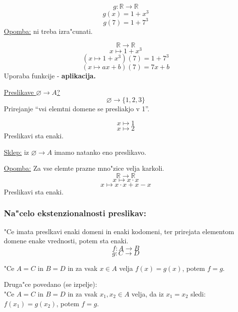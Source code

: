\[g: \mathbb{R} \rightarrow \mathbb{R}\]
\[g(x) = 1 + x^3\]
\[g(7) = 1 + 7^3\]
\underline{Opomba:} ni treba izra"cunati.

\[\mathbb{R} \rightarrow \mathbb{R}\]
\[x \mapsto 1 + x^3\]
\[(x \mapsto 1 + x^3)(7) = 1 + 7^3\]
\[(x \mapsto ax + b)(7) = 7x + b\]
Uporaba funkcije - \textbf{aplikacija.}

\underline{Preslikave \(\varnothing \rightarrow A\)?}
\[\varnothing \rightarrow \{1, 2, 3\}\]
Prirejanje ``vsi elemtni domene se presliakjo v 1''.

\[x \mapsto 1\]
\[x \mapsto 2\]
Preslikavi sta enaki.

\underline{Sklep:} iz \(\varnothing \rightarrow A\) imamo natanko eno preslikavo.

\underline{Opomba:} Za vse elemte prazne mno"zice velja karkoli.
\[\mathbb{R} \rightarrow \mathbb{R}\]
\[x \mapsto x \cdot x\]
\[x \mapsto x \cdot x + x - x\]
Preslikavi sta enaki.

\subsubsection*{Na"celo ekstenzionalnosti preslikav:} "Ce imata preslkavi enaki domeni in enaki kodomeni, ter prirejata elementom domene enake vrednosti, potem sta enaki.
\[f: A \rightarrow B\]
\[g: C \rightarrow D\]

"Ce \(A = C\) in \(B = D\) in za vsak \(x \in A\) velja \(f(x) = g(x)\), potem \(f = g\).

Druga"ce povedano (se izpelje):\\
"Ce \(A = C\) in \(B = D\) in za vsak \(x_1, x_2 \in A\) velja, da iz \(x_1 = x_2\) sledi: \(f(x_1) = g(x_2)\), potem \(f = g\).
